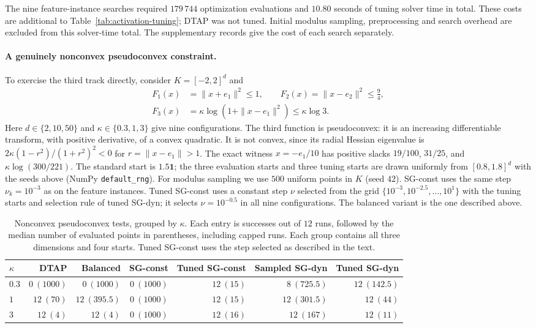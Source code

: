 \documentclass[]{interact}
\theoremstyle{plain}
\theoremstyle{definition}
\theoremstyle{remark}
\begin{document}
The nine feature-instance searches required $179\,744$ optimization
evaluations and $10.80$ seconds of tuning solver time in total. These costs
are additional to Table~\ref{tab:activation-tuning}; DTAP was not tuned.
Initial modulus sampling, preprocessing and search overhead are excluded
from this solver-time total. The supplementary records give the cost of
each search separately.

\paragraph*{A genuinely nonconvex pseudoconvex constraint.}
To exercise the third track directly, consider $K=[-2,2]^d$ and
\begin{equation}\label{eq:logball-test}
\begin{aligned}
 F_1(x)&=\|x+e_1\|^2\le1,\qquad
 F_2(x)=\|x-e_2\|^2\le\tfrac94,\\
 F_3(x)&=\kappa\log(1+\|x-e_1\|^2)\le \kappa\log3.
\end{aligned}
\end{equation}
Here $d\in\{2,10,50\}$ and $\kappa\in\{0.3,1,3\}$ give nine configurations.
The third function is pseudoconvex: it is an increasing differentiable
transform, with positive derivative, of a convex quadratic. It is not
convex, since its radial Hessian eigenvalue is
$2\kappa(1-r^2)/(1+r^2)^2<0$ for $r=\|x-e_1\|>1$.
The exact witness $x=-e_1/10$ has positive slacks
$19/100$, $31/25$, and $\kappa\log(300/221)$.
The standard start is $1.5\mathbf1$; the three evaluation starts and three
tuning starts are drawn uniformly from $[0.8,1.8]^d$ with the seeds above
(NumPy \texttt{default\_rng}).
For modulus sampling we use $500$ uniform points in $K$ (seed $42$).
SG-const uses the same step $\nu_k=10^{-3}$ as on the feature instances. Tuned
SG-const uses a constant step $\nu$ selected from the grid
$\{10^{-3},10^{-2.5},\ldots,10^1\}$ with the tuning starts and selection rule of
tuned SG-dyn; it selects $\nu=10^{-0.5}$ in all nine configurations. The balanced
variant is the one described above.

\begin{table}[t]
\centering\small
\setlength{\tabcolsep}{5pt}
\caption{Nonconvex pseudoconvex tests, grouped by $\kappa$.
Each entry is successes out of $12$ runs, followed by the median number
of evaluated points in parentheses, including capped runs. Each group
contains all three dimensions and four starts. Tuned SG-const uses the step
selected as described in the text.}
\label{tab:synthetic-scale}
\begin{tabular}{@{}lrrrrrr@{}}
\toprule
$\kappa$ & DTAP & Balanced & SG-const & Tuned SG-const & Sampled SG-dyn & Tuned SG-dyn\\
\midrule
$0.3$ & $0\ (1000)$ & $0\ (1000)$ & $0\ (1000)$ & $12\ (15)$ & $8\ (725.5)$ & $12\ (142.5)$\\
$1$   & $12\ (70)$ & $12\ (395.5)$ & $0\ (1000)$ & $12\ (15)$ & $12\ (301.5)$ & $12\ (44)$\\
$3$   & $12\ (4)$ & $12\ (4)$ & $0\ (1000)$ & $12\ (16)$ & $12\ (167)$ & $12\ (11)$\\
\bottomrule
\end{tabular}
\end{table}
\end{document}
